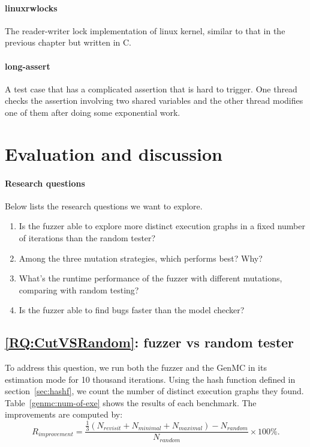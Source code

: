 \paragraph{linuxrwlocks} The reader-writer lock implementation of linux kernel, similar to that in the previous chapter but written in C.

\paragraph{long-assert} A test case that has a complicated assertion that is hard to trigger. One thread checks the assertion involving two shared variables and the other thread modifies one of them after doing some exponential work.

\section{Evaluation and discussion}

\paragraph*{Research questions} Below lists the research questions we want to explore.

\begin{enumerate}[label=RQ\arabic*,resume]
	\item Is the fuzzer able to explore more distinct execution graphs in a fixed number of iterations than the random tester? \label{RQ:CutVSRandom}
	\item Among the three mutation strategies, which performs best? Why? \label{RQ:CutComparison}
	\item What's the runtime performance of the fuzzer with different mutations, comparing with random testing? \label{RQ:GenMCOverhead}
	\item Is the fuzzer able to find bugs faster than the model checker?\label{RQ:GenMC_vs_fuzzer}
\end{enumerate}

\subsection{\ref*{RQ:CutVSRandom}: fuzzer vs random tester }

To address this question, we run both the fuzzer and the GenMC in its estimation mode for 10 thousand iterations. Using the hash function defined in section~\ref{sec:hashf}, we count the number of distinct execution graphs they found. Table~\ref{genmc:num-of-exe} shows the results of each benchmark. The improvements are computed by:
\[
	R_{improvement} = \frac{\frac{1}{3} (N_{revisit}+N_{minimal}+N_{maximal}) - N_{random} }{N_{random}} \times 100 \%.
\]

